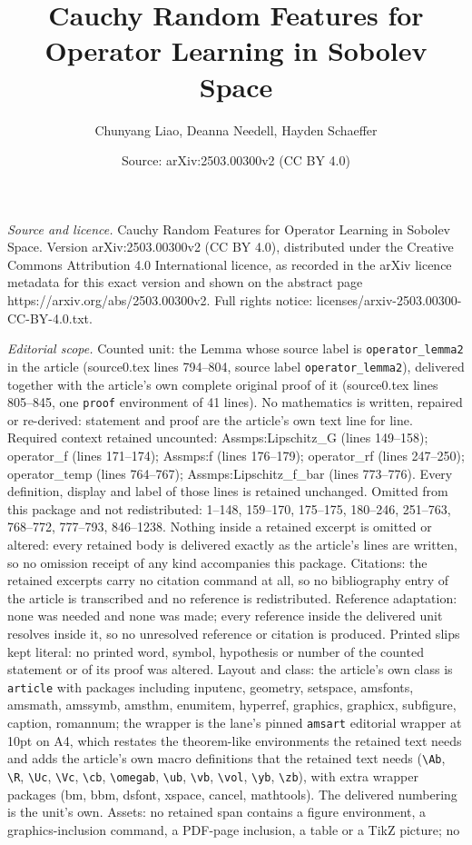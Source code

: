 \documentclass[10pt,a4paper]{amsart}
\title[Cauchy Random Features for Operator Learning in Sobolev Spac]{Cauchy Random Features for Operator Learning in Sobolev Space}
\author{Chunyang Liao, Deanna Needell, Hayden Schaeffer}
\date{Source: arXiv:2503.00300v2 (CC BY 4.0)}
\begin{document}
\maketitle

\noindent\emph{Source and licence.} Cauchy Random Features for Operator Learning in Sobolev Space. Version arXiv:2503.00300v2 (CC BY 4.0), distributed under the Creative Commons Attribution 4.0 International licence, as recorded in the arXiv licence metadata for this exact version and shown on the abstract page https://arxiv.org/abs/2503.00300v2. Full rights notice: licenses/arxiv-2503.00300-CC-BY-4.0.txt.\par\smallskip

\noindent\textit{Editorial scope.} Counted unit: the Lemma whose source label is \texttt{operator\_lemma2} in the article (source0.tex lines 794--804, source label \texttt{operator\_lemma2}), delivered together with the article's own complete original proof of it (source0.tex lines 805--845, one \texttt{proof} environment of 41 lines). No mathematics is written, repaired or re-derived: statement and proof are the article's own text line for line. Required context retained uncounted: Assmps:Lipschitz\_G (lines 149--158); operator\_f (lines 171--174); Assmps:f (lines 176--179); operator\_rf (lines 247--250); operator\_temp (lines 764--767); Assmps:Lipschitz\_f\_bar (lines 773--776). Every definition, display and label of those lines is retained unchanged. Omitted from this package and not redistributed: 1--148, 159--170, 175--175, 180--246, 251--763, 768--772, 777--793, 846--1238. Nothing inside a retained excerpt is omitted or altered: every retained body is delivered exactly as the article's lines are written, so no omission receipt of any kind accompanies this package. Citations: the retained excerpts carry no citation command at all, so no bibliography entry of the article is transcribed and no reference is redistributed. Reference adaptation: none was needed and none was made; every reference inside the delivered unit resolves inside it, so no unresolved reference or citation is produced. Printed slips kept literal: no printed word, symbol, hypothesis or number of the counted statement or of its proof was altered. Layout and class: the article's own class is \texttt{article} with packages including inputenc, geometry, setspace, amsfonts, amsmath, amssymb, amsthm, enumitem, hyperref, graphics, graphicx, subfigure, caption, romannum; the wrapper is the lane's pinned \texttt{amsart} editorial wrapper at 10pt on A4, which restates the theorem-like environments the retained text needs and adds the article's own macro definitions that the retained text needs (\texttt{\textbackslash Ab}, \texttt{\textbackslash R}, \texttt{\textbackslash Uc}, \texttt{\textbackslash Vc}, \texttt{\textbackslash cb}, \texttt{\textbackslash omegab}, \texttt{\textbackslash ub}, \texttt{\textbackslash vb}, \texttt{\textbackslash vol}, \texttt{\textbackslash yb}, \texttt{\textbackslash zb}), with extra wrapper packages (bm, bbm, dsfont, xspace, cancel, mathtools). The delivered numbering is the unit's own. Assets: no retained span contains a figure environment, a graphics-inclusion command, a PDF-page inclusion, a table or a TikZ picture; no 
\end{document}
